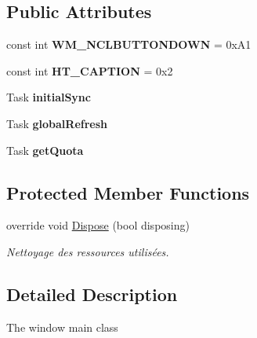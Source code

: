 \subsection*{Public Attributes}
\begin{DoxyCompactItemize}
\item 
\mbox{\label{class_mail_storage_1_1_mail_storage_a18b7c003fb2e0224c49170ce3860b776}} 
const int {\bfseries W\+M\+\_\+\+N\+C\+L\+B\+U\+T\+T\+O\+N\+D\+O\+WN} = 0x\+A1
\item 
\mbox{\label{class_mail_storage_1_1_mail_storage_a2fda94acfe6689309e7a686d80df2282}} 
const int {\bfseries H\+T\+\_\+\+C\+A\+P\+T\+I\+ON} = 0x2
\item 
\mbox{\label{class_mail_storage_1_1_mail_storage_a67aceb1c37ff2921d1263c5a3d5ad256}} 
Task {\bfseries initial\+Sync}
\item 
\mbox{\label{class_mail_storage_1_1_mail_storage_ab06602e92c2881e496b03852e2732729}} 
Task {\bfseries global\+Refresh}
\item 
\mbox{\label{class_mail_storage_1_1_mail_storage_a9b813f6d46a8e4d5ac8103648a161a0c}} 
Task {\bfseries get\+Quota}
\end{DoxyCompactItemize}
\subsection*{Protected Member Functions}
\begin{DoxyCompactItemize}
\item 
override void \hyperlink{class_mail_storage_1_1_mail_storage_a08abad1b434fac866b442755bed1c9f8}{Dispose} (bool disposing)
\begin{DoxyCompactList}\small\item\em Nettoyage des ressources utilisées. \end{DoxyCompactList}\end{DoxyCompactItemize}


\subsection{Detailed Description}
The window main class 




